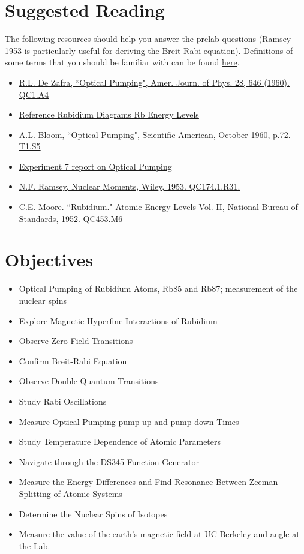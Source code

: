 \documentclass[11pt]{article}
\begin{document}
\section{Suggested Reading}
The following resources should help you answer the prelab questions (Ramsey 1953 is particularly useful for deriving the Breit-Rabi equation). Definitions of some terms that you should be familiar with can be found \href{http://experimentationlab.berkeley.edu/definitionsopt}{here}.
\begin{itemize}
\item \href{http://physics111.lib.berkeley.edu/Physics111/Reprints/OPT/05-Optical_Pumping-DeZafra.pdf}{R.L. De Zafra, ``Optical Pumping", Amer. Journ. of Phys. 28, 646 (1960). QC1.A4}
\item \href{http://experimentationlab.berkeley.edu/sites/default/files/images/OPT_RbEnergyLevels.pdf}{Reference Rubidium Diagrams Rb Energy Levels}
\item \href{http://physics111.lib.berkeley.edu/Physics111/Reprints/OPT/02-Optical_Pumping-Bloom.pdf}{A.L. Bloom, ``Optical Pumping", Scientific American, October 1960, p.72. T1.S5}
\item \href{http://physics111.lib.berkeley.edu/Physics111/Reprints/OPT/06-Experiment_7.pdf}{Experiment 7 report on Optical Pumping}
\item \href{http://physics111.lib.berkeley.edu/Physics111/Reprints/OPT/04-Nuclear_Moments.pdf}{N.F. Ramsey, Nuclear Moments, Wiley, 1953. QC174.1.R31.}
\item \href{http://physics111.lib.berkeley.edu/Physics111/Reprints/OPT/OPT%20Rubidium.pdf}{C.E. Moore. ``Rubidium." Atomic Energy Levels Vol. II, National Bureau of Standards, 1952. QC453.M6}
\end{itemize}

\section{Objectives}
\begin{itemize}
\item Optical Pumping of Rubidium Atoms, Rb85 and Rb87; measurement of the nuclear spins
\item Explore Magnetic Hyperfine Interactions of Rubidium
\item Observe Zero-Field Transitions
\item Confirm Breit-Rabi Equation
\item Observe Double Quantum Transitions
\item Study Rabi Oscillations 
\item Measure Optical Pumping pump up and pump down Times
\item Study Temperature Dependence of Atomic Parameters
\item Navigate through the DS345 Function Generator 
\item Measure the Energy Differences and Find Resonance Between Zeeman Splitting of Atomic Systems
\item Determine the Nuclear Spins of Isotopes 
\item Measure the value of the earth's magnetic field at UC Berkeley and angle at the Lab.
\end{itemize}
\end{document}
